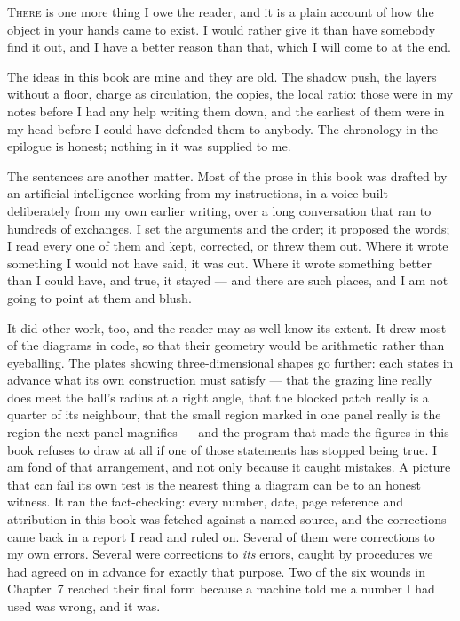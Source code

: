 
\lettrine{T}{here} is one more thing I owe the reader, and it is a plain account of how the object in your hands came to exist. I would rather give it than have somebody find it out, and I have a better reason than that, which I will come to at the end.

The ideas in this book are mine and they are old. The shadow push, the layers without a floor, charge as circulation, the copies, the local ratio: those were in my notes before I had any help writing them down, and the earliest of them were in my head before I could have defended them to anybody. The chronology in the epilogue is honest; nothing in it was supplied to me.

The sentences are another matter. Most of the prose in this book was drafted by an artificial intelligence working from my instructions, in a voice built deliberately from my own earlier writing, over a long conversation that ran to hundreds of exchanges. I set the arguments and the order; it proposed the words; I read every one of them and kept, corrected, or threw them out. Where it wrote something I would not have said, it was cut. Where it wrote something better than I could have, and true, it stayed --- and there are such places, and I am not going to point at them and blush.

It did other work, too, and the reader may as well know its extent. It drew most of the diagrams in code, so that their geometry would be arithmetic rather than eyeballing. The plates showing three-dimensional shapes go further: each states in advance what its own construction must satisfy --- that the grazing line really does meet the ball's radius at a right angle, that the blocked patch really is a quarter of its neighbour, that the small region marked in one panel really is the region the next panel magnifies --- and the program that made the figures in this book refuses to draw at all if one of those statements has stopped being true. I am fond of that arrangement, and not only because it caught mistakes. A picture that can fail its own test is the nearest thing a diagram can be to an honest witness. It ran the fact-checking: every number, date, page reference and attribution in this book was fetched against a named source, and the corrections came back in a report I read and ruled on. Several of them were corrections to my own errors. Several were corrections to \emph{its} errors, caught by procedures we had agreed on in advance for exactly that purpose. Two of the six wounds in Chapter~7 reached their final form because a machine told me a number I had used was wrong, and it was.

